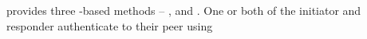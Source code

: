 %    
\mEdhoc{} provides three \mStat-based methods -- \mSigStat{}, \mStatStat{} and
\mStatSig{}.
%
One or both of the initiator and responder authenticate to their peer using
